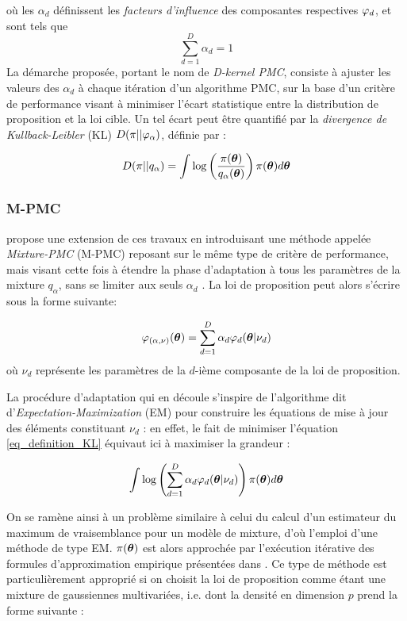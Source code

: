 où les $\alpha_d$ définissent les \textit{facteurs d'influence} des composantes respectives ${\varphi}_d$, et sont tels que $$\sum\limits_{d=1}^D \alpha_d = 1$$  La démarche proposée, portant le nom de \textit{D-kernel PMC}, consiste à ajuster les valeurs des $\alpha_d$ à chaque itération d'un algorithme PMC, sur la base d'un critère de performance visant à minimiser l'écart statistique entre la distribution de proposition et la loi cible. Un tel écart peut être quantifié par la \textit{divergence de Kullback-Leibler} (KL)  $D(\pi || {\varphi}_\alpha )$, définie par : 

\begin{equation}
	D(\pi || q_\alpha ) = \int \log\left(\dfrac{\pi({\bm{\theta}})}{q_\alpha({\bm{\theta}})}\right)\pi({\bm{\theta}})d{\bm{\theta}}
	\label{eq_definition_KL}
\end{equation}

\subsubsection{M-PMC}

\cite{Cappe2008} propose une extension de ces travaux en introduisant une méthode appelée \textit{Mixture-PMC} (M-PMC) reposant sur le même type de critère de performance, mais visant cette fois à étendre la phase d'adaptation à tous les paramètres de la mixture $q_{\alpha}$, sans se limiter aux seuls $\alpha_d$ . La loi de proposition peut alors s'écrire sous la forme suivante:

\begin{equation}
	{\varphi}_{(\alpha,\nu)}({\bm{\theta}}) = \sum\limits_{d=1}^D\alpha_d {\varphi}_d({\bm{\theta}} |\nu_d)
	\label{eq_M_PMC_kernel}
\end{equation}
où $\nu_d$ représente les paramètres de la $d$-ième composante de la loi de proposition.

La procédure d'adaptation qui en découle s'inspire de l'algorithme dit d'\textit{Expectation-Maximization} (EM) pour construire les équations de mise à jour des éléments constituant $\nu_d$ : en effet, le fait de minimiser l'équation \eqref{eq_definition_KL} équivaut ici  à maximiser la grandeur : 

\begin{equation}
	\int \log\left(\sum\limits_{d=1}^D \alpha_d {\varphi}_d({\bm{\theta}}| \nu_d)\right)\pi({\bm{\theta}})d{\bm{\theta}}
	\label{eq_KL_pour_EM}
\end{equation} 

On se ramène ainsi à un problème similaire à celui du calcul d'un estimateur du maximum de vraisemblance pour un modèle de mixture, d'où l'emploi d'une méthode de type EM. {$\pi({\bm{\theta}})$ est alors approchée par l'exécution itérative des formules d'approximation empirique présentées dans \cite{Cappe2008}.}
Ce type de méthode est particulièrement approprié si on choisit la loi de proposition comme étant une mixture de gaussiennes multivariées, i.e. dont la densité en dimension $p$ prend la forme suivante : 

